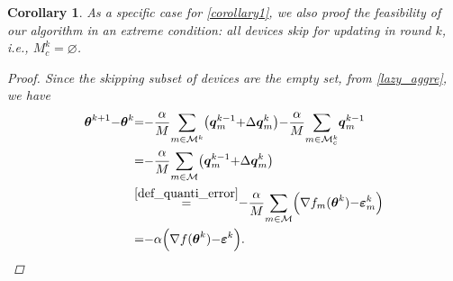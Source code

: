 \documentclass[lettersize,journal]{IEEEtran}
\newtheorem{corollary}{Corollary}
\begin{document}
\begin{corollary}
\textit{As a specific case for \cref{corollary1}, we also proof the feasibility of our algorithm in an extreme condition: all devices skip for updating in round $k$, i.e., $M_c^k = \varnothing$.}
\begin{proof}
    Since the skipping subset of devices are the empty set, from \eqref{lazy_aggre}, we have
    \begin{equation}
    \thinmuskip=0mu
    \medmuskip=0mu
    \thickmuskip=0mu
    \begin{aligned}
        \boldsymbol{\theta} ^{k+1} - \boldsymbol{\theta} ^{k} &= -\frac{\alpha}{M}\sum_{m \in \mathcal{M}^k}\left(\boldsymbol{q}_{m}^{k-1} + \Delta \boldsymbol{q}_{m}^{k}\right) - \frac{\alpha}{M} \sum_{m \in \mathcal{M}_{c}^{k}}\boldsymbol{q}_{m}^{k-1} \\ 
        &{=} - \frac{\alpha}{M}\sum_{m \in \mathcal{M}}\left(\boldsymbol{q}_{m}^{k-1} + \Delta \boldsymbol{q}_{m}^{k}\right) \\
        &\overset{\eqref{def_quanti_error}}{=} - \frac{\alpha}{M}\sum_{m \in \mathcal{M}}\left(\nabla f_m (\boldsymbol{\theta}^k) - \boldsymbol{\varepsilon}_m^k \right) \\
        &{=} - \alpha \left(\nabla f (\boldsymbol{\theta}^k) - \boldsymbol{\varepsilon}^k \right).
    \end{aligned}
    \end{equation}
    

\end{proof}
\end{corollary}
\end{document}
